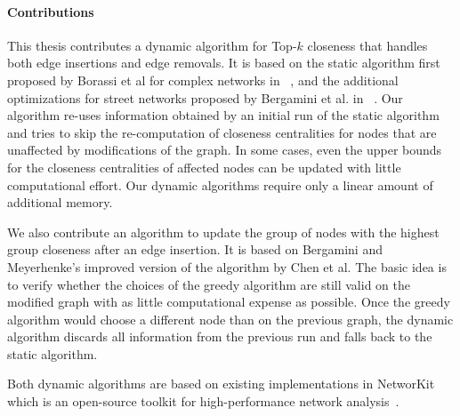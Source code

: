 \paragraph{Contributions}
This thesis contributes a dynamic algorithm for Top-$k$ closeness that handles both edge insertions and edge removals. It is based on the static algorithm first proposed by Borassi et al for complex networks in ~\cite{borassi2015fast}, and the additional optimizations for street networks proposed by Bergamini et al. in ~\cite{bergamini2016computing}. Our algorithm re-uses information obtained by an initial run of the static algorithm and tries to skip the re-computation of closeness centralities for nodes that are unaffected by modifications of the graph. In some cases, even the upper bounds for the closeness centralities of affected nodes can be updated with little computational effort. Our dynamic algorithms require only a linear amount of additional memory.

We also contribute an algorithm to update the group of nodes with the highest group closeness after an edge insertion. It is based on Bergamini and Meyerhenke's improved version of the algorithm by Chen et al. The basic idea is to verify whether the choices of the greedy algorithm are still valid on the modified graph with as little computational expense as possible. Once the greedy algorithm would choose a different node than on the previous graph, the dynamic algorithm discards all information from the previous run and falls back to the static algorithm.

Both dynamic algorithms are based on existing implementations in NetworKit which is an open-source toolkit for high-performance network analysis~\cite{staudt2014networkit}.